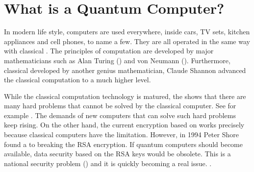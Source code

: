 \documentclass[letterpaper,10pt,english]{jupyterBook}
\begin{document}
\chapter{What is a Quantum Computer?}
\label{\detokenize{computation/intro:what-is-a-quantum-computer}}\label{\detokenize{computation/intro:chap-whatisqcomp}}\label{\detokenize{computation/intro::doc}}
\sphinxAtStartPar
In modern life style, computers are used everywhere, inside cars, TV sets, kitchen appliances and cell phones, to name a few.  They are all operated in the same way with classical .  The principles of computation are developed by major mathematicians such as Alan Turing () and von Neumann ().  Furthermore, classical  developed by another genius mathematician, Claude Shannon advanced the classical computation to a much higher level.

\sphinxAtStartPar
While the classical computation technology is matured, the  shows that there are many hard problems that cannot be solved by the classical computer. See for example .  The demands of new computers that can solve such hard problems keep rising.  On the other hand, the current encryption based on  works precisely because classical computers have the limitation.  However, in 1994 Peter Shore found a  to breaking the RSA encryption.  If quantum computers should become available, data security based on the RSA keys would be obsolete. This is a national security problem ()  and it is quickly becoming a real issue.  .
\end{document}
